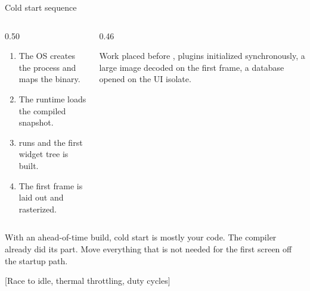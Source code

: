 \documentclass[10pt,aspectratio=169,t]{beamer}
\begin{document}
\begin{frame}[eyebrow=Compilation]{Cold start sequence}
  \vskip 2mm
  \begin{columns}[T]
    \begin{column}{0.50\textwidth}
      \begin{enumerate}
        \item The OS creates the process and maps the binary.
        \item The runtime loads the compiled snapshot.
        \item {} runs and the first widget tree is built.
        \item The first frame is laid out and rasterized.
      \end{enumerate}
    \end{column}
    \begin{column}{0.46\textwidth}
      \begin{hint}
        Work placed before , plugins initialized synchronously, a large image decoded on the first frame, a database opened on the UI isolate.
      \end{hint}
    \end{column}
  \end{columns}
  \begin{takeaway}{With an ahead-of-time build, cold start is mostly your code.}
    The compiler already did its part. Move everything that is not needed for the first screen off the startup path.
  \end{takeaway}
\end{frame}

[Race to idle, thermal throttling, duty cycles]
\end{document}
